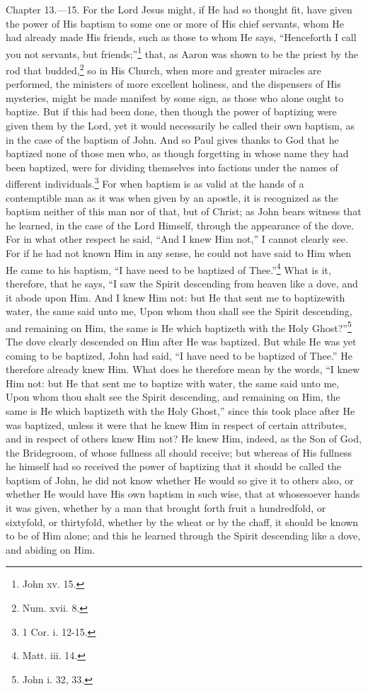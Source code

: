 Chapter 13.—15. For the Lord Jesus might, if He had so thought fit, have given the power of His baptism to some one or more of His chief servants, whom He had already made His friends, such as those to whom He says, ``Henceforth I call you not servants, but friends;''\footnote{\par  John xv. 15.} that, as Aaron was shown to be the priest by the rod that budded,\footnote{\par  Num. xvii. 8.} so in His Church, when more and greater miracles are performed, the ministers of more excellent holiness, and the dispensers of His mysteries, might be made manifest by some sign, as those who alone ought to baptize. But if this had been done, then though the power of baptizing were given them by the Lord, yet it would necessarily be called their own baptism, as in the case of the baptism of John. And so Paul gives thanks to God that he baptized none of those men who, as though forgetting in whose name they had been baptized, were for dividing themselves into factions under the names of different individuals.\footnote{\par  1 Cor. i. 12-15.} For when baptism is as valid at the hands of a contemptible man as it was when given by an apostle, it is recognized as the baptism neither of this man nor of that, but of Christ; as John bears witness that he learned, in the case of the Lord Himself, through the appearance of the dove. For in what other respect he said, ``And I knew Him not,'' I cannot clearly see. For if he had not known Him in any sense, he could not have said to Him when He came to his baptism, ``I have need to be baptized of Thee.''\footnote{\par  Matt. iii. 14.} What is it, therefore, that he says, ``I saw the Spirit descending from heaven like a dove, and it abode upon Him. And I knew Him not: but He that sent me to baptizewith water, the same said unto me, Upon whom thou shall see the Spirit descending, and remaining on Him, the same is He which baptizeth with the Holy Ghost?''\footnote{\par  John i. 32, 33.} The dove clearly descended on Him after He was baptized. But while He was yet coming to be baptized, John had said, ``I have need to be baptized of Thee.'' He therefore already knew Him. What does he therefore mean by the words, ``I knew Him not: but He that sent me to baptize with water, the same said unto me, Upon whom thou shalt see the Spirit descending, and remaining on Him, the same is He which baptizeth with the Holy Ghost,'' since this took place after He was baptized, unless it were that he knew Him in respect of certain attributes, and in respect of others knew Him not? He knew Him, indeed, as the Son of God, the Bridegroom, of whose fullness all should receive; but whereas of His fullness he himself had so received the power of baptizing that it should be called the baptism of John, he did not know whether He would so give it to others also, or whether He would have His own baptism in such wise, that at whosesoever hands it was given, whether by a man that brought forth fruit a hundredfold, or sixtyfold, or thirtyfold, whether by the wheat or by the chaff, it should be known to be of Him alone; and this he learned through the Spirit descending like a dove, and abiding on Him.

